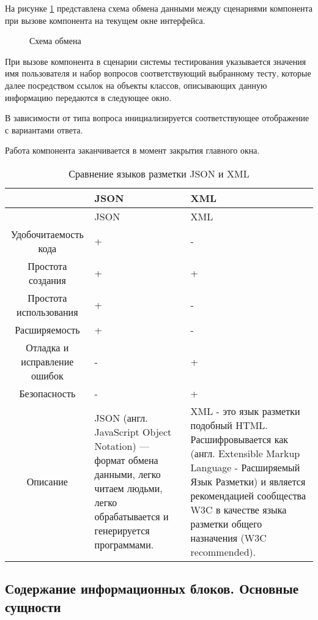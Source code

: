 На рисунке \ref{exchange_scheme:image} представлена схема обмена данными между сценариями компонента при вызове компонента на текущем окне интерфейса.

\begin{figure}[H]
\caption{Схема обмена}
\label{exchange_scheme:image}
\end{figure}

При вызове компонента в сценарии системы тестирования указывается значения имя пользователя и набор вопросов соответствующий выбранному тесту, которые далее посредством ссылок на объекты классов, описывающих данную информацию передаются в следующее окно.

В зависимости от типа вопроса инициализируется соответствующее отображение с вариантами ответа.

Работа компонента заканчивается в момент закрытия главного окна.

\begin{xltabular}{\textwidth}{|c|X|X|}
	\caption{Сравнение языков разметки JSON и XML\label{JSONvsXM:table}}\\ \hline
	~  & \centrow  JSON & \centrow XML \\ \hline
	\endfirsthead
	~ & \centrow JSON & \centrow XML \\ \hline 
	\finishhead
	Удобочитаемость кода & + & - \\ \hline 
	Простота создания  & + & + \\ \hline 
	Простота использования & + & - \\ \hline 
	Расширяемость & + & - \\ \hline
	Отладка и исправление ошибок & - & + \\ \hline
	Безопасность & - & + \\ \hline
	Описание & JSON (англ. JavaScript Object Notation) — формат обмена данными, легко читаем людьми, легко обрабатывается и генерируется программами. & XML - это язык разметки подобный HTML. Расшифровывается как (англ. Extensible Markup Language - Расширяемый Язык Разметки) и является рекомендацией сообщества W3C в качестве языка разметки общего назначения (W3C recommended).
\end{xltabular}

\subsection{Содержание информационных блоков. Основные сущности}

